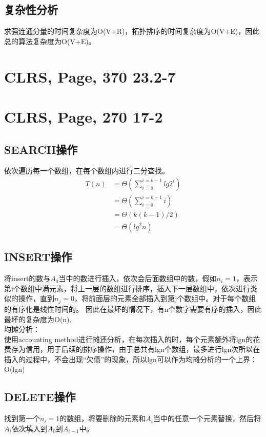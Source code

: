 \documentclass[UTF8]{ctexart}
\begin{document}
 \subsection{复杂性分析}
 求强连通分量的时间复杂度为O(V+R)，拓扑排序的时间复杂度为O(V+E)，因此总的算法复杂度为O(V+E)。


\section{CLRS, Page, 370 23.2-7}



\section{CLRS, Page, 270 17-2}

\subsection{SEARCH操作}
依次遍历每一个数组，在每个数组内进行二分查找。
\begin{align*}
    T(n)    &=  \Theta  (\sum_{i = 0}^{i = k-1}lg2^i )  \\  
            &=  \Theta  (\sum_{i = 0}^{i = k-1}i ) \\
            &= \Theta  (k(k-1)/2)\\
            &= \Theta({lg}^2n)
\end{align*}

\subsection{INSERT操作}
将insert的数与$A_0$当中的数进行插入，依次会后面数组中的数，假如$n_i=1$，表示第i个数组中满元素，将上一层的数组进行排序，插入下一层数组中，依次进行类似的操作，直到$n_j = 0$，将前面层的元素全部插入到第j个数组中。对于每个数组的有序化是线性时间的。
因此在最坏的情况下，有n个数字需要有序的插入，因此最坏的复杂度为O(n).\\

均摊分析：\\
使用accounting method进行摊还分析，在每次插入的时，每个元素额外将lgn的花费存为信用，用于后续的排序操作，由于总共有lgn个数组，最多进行lgn次所以在插入的过程中，不会出现“欠债”的现象，所以lgn可以作为均摊分析的一个上界：O(lgn)

\subsection{DELETE操作}
找到第一个$n_i=1$的数组，将要删除的元素和$A_i$当中的任意一个元素替换，然后将$A_i$依次填入到$A_0$到$A_{i-1}$中。
\end{document}
